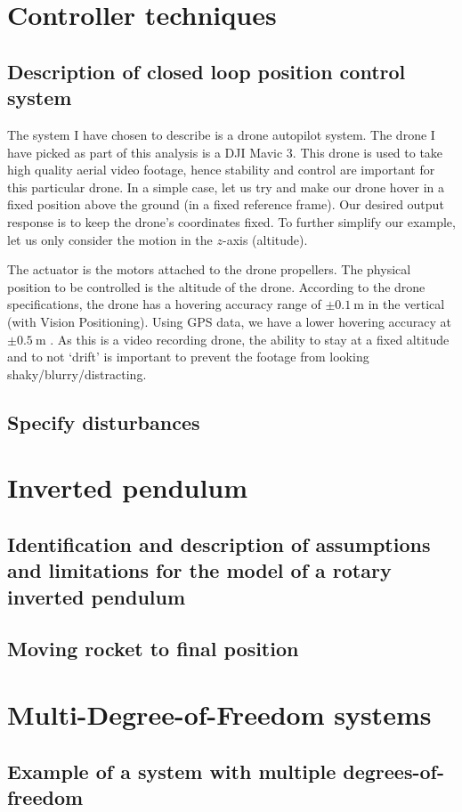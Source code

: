 \documentclass[11pt]{article}
\numberwithin{equation}{section}
\begin{document}
\section{Controller techniques}
\subsection{Description of closed loop position control system}
The system I have chosen to describe is a drone autopilot system. The drone I have picked as part of this analysis is a DJI Mavic 3. This drone is used to take high quality aerial video footage, hence stability and control are important for this particular drone. In a simple case, let us try and make our drone hover in a fixed position above the ground (in a fixed reference frame). Our desired output response is to keep the drone's coordinates fixed. To further simplify our example, let us only consider the motion in the $z$-axis (altitude). 

The actuator is the motors attached to the drone propellers. The physical position to be controlled is the altitude of the drone. According to the drone specifications, the drone has a hovering accuracy range of $\pm\SI{0.1}{\metre}$ in the vertical (with Vision Positioning). Using GPS data, we have a lower hovering accuracy at $\pm \SI{0.5}{\metre}$ \citep{dji}. As this is a video recording drone, the ability to stay at a fixed altitude and to not `drift' is important to prevent the footage from looking shaky/blurry/distracting. 
\subsection{Specify disturbances}
\section{Inverted pendulum}
\subsection{Identification and description of assumptions and limitations for the model of a rotary inverted pendulum}
\subsection{Moving rocket to final position}
\section{Multi-Degree-of-Freedom systems}
\subsection{Example of a system with multiple degrees-of-freedom}


\end{document}
